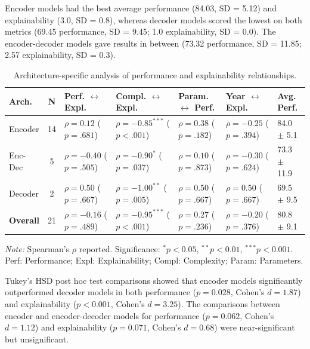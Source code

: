 \documentclass[preprint,12pt]{elsarticle}
\begin{document}
Encoder models had the best average performance (84.03, SD = 5.12) and explainability (3.0, SD = 0.8), whereas decoder models scored the lowest on both metrics (69.45 performance, SD = 9.45; 1.0 explainability, SD = 0.0). The encoder-decoder models gave results in between (73.32 performance, SD = 11.85; 2.57 explainability, SD = 0.3).

\begin{table}[ht!]
\centering
\caption{Architecture-specific analysis of performance and explainability relationships.}
\label{tab:architecture_correlations}
\small
\setlength{\tabcolsep}{3pt} %

\begin{tabularx}{\textwidth}{@{} l c C C C C C @{}}
\toprule
\textbf{Arch.} & \textbf{N} & \textbf{Perf. $\leftrightarrow$ Expl.} & \textbf{Compl. $\leftrightarrow$ Expl.} & \textbf{Param. $\leftrightarrow$ Perf.} & \textbf{Year $\leftrightarrow$ Expl.} & \textbf{Avg. Perf.} \\
\midrule
Encoder & 14 & $\rho = 0.12$ ($p = .681$) & $\rho = -0.85^{***}$ ($p < .001$) & $\rho = 0.38$ ($p = .182$) & $\rho = -0.25$ ($p = .394$) & 84.0 $\pm$ 5.1 \\
\addlinespace
Enc-Dec & 5 & $\rho = -0.40$ ($p = .505$) & $\rho = -0.90^{*}$ ($p = .037$) & $\rho = 0.10$ ($p = .873$) & $\rho = -0.30$ ($p = .624$) & 73.3 $\pm$ 11.9 \\
\addlinespace
Decoder & 2 & $\rho = 0.50$ ($p = .667$) & $\rho = -1.00^{**}$ ($p = .005$) & $\rho = 0.50$ ($p = .667$) & $\rho = 0.50$ ($p = .667$) & 69.5 $\pm$ 9.5 \\
\midrule
\textbf{Overall} & 21 & $\rho = -0.16$ ($p = .489$) & $\rho = -0.95^{***}$ ($p < .001$) & $\rho = 0.27$ ($p = .236$) & $\rho = -0.20$ ($p = .376$) & 80.8 $\pm$ 9.1 \\
\bottomrule
\end{tabularx}

\begin{tablenotes}
    \footnotesize
    \item \textit{Note:} Spearman's $\rho$ reported. Significance: $^{*}p < 0.05$, $^{**}p < 0.01$, $^{***}p < 0.001$. Perf: Performance; Expl: Explainability; Compl: Complexity; Param: Parameters.
\end{tablenotes}
\end{table}

Tukey's HSD post hoc test comparisons showed that encoder models significantly outperformed decoder models in both performance ($p = 0.028$, Cohen's $d = 1.87$) and explainability ($p < 0.001$, Cohen's $d = 3.25$). The comparisons between encoder and encoder-decoder models for performance ($p = 0.062$, Cohen's $d = 1.12$) and explainability ($p = 0.071$, Cohen's $d = 0.68$) were near-significant but unsignificant.
\end{document}
